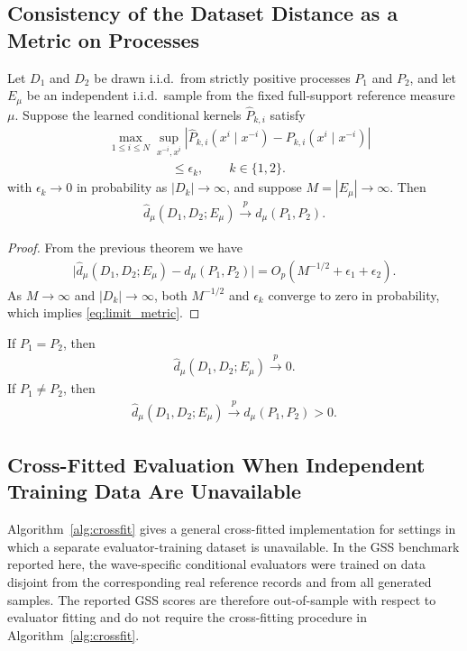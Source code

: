 \documentclass[runningheads]{llncs}
\def\EQSP{3pt}
\newcommand{\cgather}[2][\EQSP]{\begingroup\setlength\abovedisplayskip{#1}\setlength\belowdisplayskip{#1}\begin{gather} #2 \end{gather}\endgroup\noindent}
\newcommand{\calign}[2][\EQSP]{\begingroup\setlength\abovedisplayskip{#1}\setlength\belowdisplayskip{#1}\begin{align} #2 \end{align}\endgroup\noindent}
\begin{document}
\subsection{Consistency of the Dataset Distance as a Metric on Processes}
\begin{theorem}
Let $D_1$ and $D_2$ be drawn i.i.d.\ from strictly positive processes
$P_1$ and $P_2$, and let $E_{\mu}$ be an independent i.i.d.\ sample from the
fixed full-support reference measure $\mu$. Suppose the learned conditional kernels $\widehat P_{k,i}$ satisfy
\calign{
&\max_{1\leq i\leq N}\sup_{x^{-i},x^i}
\left\lvert
\widehat P_{k,i}(x^i\mid x^{-i})-P_{k,i}(x^i\mid x^{-i})
\right\rvert\\
&\hspace{5em}\leq \epsilon_k,
\qquad k\in\{1,2\}.
}
with $\epsilon_k\to 0$ in probability as $|D_k|\to\infty$, and suppose
$M=|E_{\mu}|\to\infty$. Then
\cgather{
\widehat d_{\mu}(D_1,D_2;E_{\mu})
\xrightarrow{p}
d_{\mu}(P_1,P_2).
\label{eq:limit_metric}
}
\end{theorem}

\begin{proof}
From the previous theorem we have
\cgather{
\big|
\widehat d_{\mu}(D_1,D_2;E_{\mu})-d_{\mu}(P_1,P_2)
\big|
=
O_p\!\left(
M^{-1/2}
+
\epsilon_1
+
\epsilon_2
\right).
}
As $M\to\infty$ and $|D_k|\to\infty$, both $M^{-1/2}$ and $\epsilon_k$ converge to zero in probability, which implies \eqref{eq:limit_metric}.
\end{proof}

\begin{corollary}
If $P_1=P_2$, then
\cgather{
\widehat d_{\mu}(D_1,D_2;E_{\mu})\xrightarrow{p}0.
}
If $P_1\neq P_2$, then
\cgather{
\widehat d_{\mu}(D_1,D_2;E_{\mu})
\xrightarrow{p}d_{\mu}(P_1,P_2)>0.
}
\end{corollary}

\subsection{Cross-Fitted Evaluation When Independent Training Data Are Unavailable}

Algorithm~\ref{alg:crossfit} gives a general cross-fitted implementation for
settings in which a separate evaluator-training dataset is unavailable. In the
GSS benchmark reported here, the wave-specific conditional evaluators were
trained on data disjoint from the corresponding real reference records and from all generated samples. The reported GSS scores are
therefore out-of-sample with respect to evaluator fitting and do not require the
cross-fitting procedure in Algorithm~\ref{alg:crossfit}.
\end{document}
